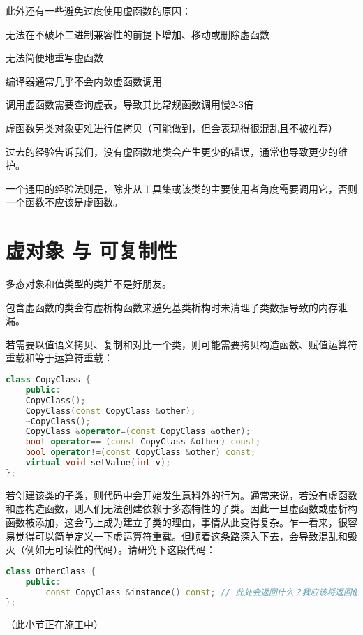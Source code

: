 此外还有一些避免过度使用虚函数的原因：

\begin{compactitem}[\arr]
\item 无法在不破坏二进制兼容性的前提下增加、移动或删除虚函数
\item 无法简便地重写虚函数
\item 编译器通常几乎不会内敛虚函数调用
\item 调用虚函数需要查询虚表，导致其比常规函数调用慢2-3倍
\item 虚函数另类对象更难进行值拷贝（可能做到，但会表现得很混乱且不被推荐）
\end{compactitem}

过去的经验告诉我们，没有虚函数地类会产生更少的错误，通常也导致更少的维护。

一个通用的经验法则是，除非从工具集或该类的主要使用者角度需要调用它，否则一个函数不应该是虚函数。

\section{虚对象 与 可复制性}

多态对象和值类型的类并不是好朋友。

包含虚函数的类会有虚析构函数来避免基类析构时未清理子类数据导致的内存泄漏。

若需要以值语义拷贝、复制和对比一个类，则可能需要拷贝构造函数、赋值运算符重载和等于运算符重载：

\begin{lstlisting}[language=C++]
class CopyClass {
	public:
	CopyClass();
	CopyClass(const CopyClass &other);
	~CopyClass();
	CopyClass &operator=(const CopyClass &other);
	bool operator== (const CopyClass &other) const;
	bool operator!=(const CopyClass &other) const;
	virtual void setValue(int v);
};
\end{lstlisting}


若创建该类的子类，则代码中会开始发生意料外的行为。通常来说，若没有虚函数和虚构造函数，则人们无法创建依赖于多态特性的子类。因此一旦虚函数或虚析构函数被添加，这会马上成为建立子类的理由，事情从此变得复杂。乍一看来，很容易觉得可以简单定义一下虚运算符重载。但顺着这条路深入下去，会导致混乱和毁灭（例如无可读性的代码）。请研究下这段代码：

\begin{lstlisting}[language=C++]
class OtherClass {
	public:
	    const CopyClass &instance() const; // 此处会返回什么？我应该将返回值赋值给谁？
};
\end{lstlisting}
（此小节正在施工中）

